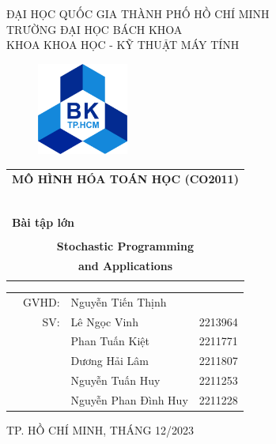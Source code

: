 \documentclass[a4paper]{article}
\begin{document}
\begin{titlepage}
\begin{center}
ĐẠI HỌC QUỐC GIA THÀNH PHỐ HỒ CHÍ MINH \\
TRƯỜNG ĐẠI HỌC BÁCH KHOA \\
KHOA KHOA HỌC - KỸ THUẬT MÁY TÍNH 
\end{center}

\vspace{1cm}

\begin{figure}[h!]
\begin{center}
\includegraphics[width=3cm]{hcmut.png}
\end{center}
\end{figure}

\vspace{1cm}


\begin{center}
\begin{tabular}{c}
\multicolumn{1}{l}{\textbf{{\Large MÔ HÌNH HÓA TOÁN HỌC (CO2011)}}}\\
~~\\
\hline
\\
\multicolumn{1}{l}{\textbf{{\Large Bài tập lớn}}}\\
\\
\textbf{{\Huge Stochastic Programming}}\\
\textbf{{\Huge and Applications}}\\
\\
\hline
\end{tabular}
\end{center}

\vspace{2cm}

\begin{table}[h]
\begin{tabular}{rrlr}
\hspace{5 cm} & GVHD: & Nguyễn Tiến Thịnh\\
& SV: & Lê Ngọc Vinh &2213964 \\
& & Phan Tuấn Kiệt   &2211771 \\
& & Dương Hải Lâm &2211807 \\
& & Nguyễn Tuấn Huy &2211253 \\
& & Nguyễn Phan Đình Huy &2211228 \\
\end{tabular}
\end{table}
\vspace{2cm}
\begin{center}
{\footnotesize TP. HỒ CHÍ MINH, THÁNG 12/2023}
\end{center}
\end{titlepage}
\end{document}
